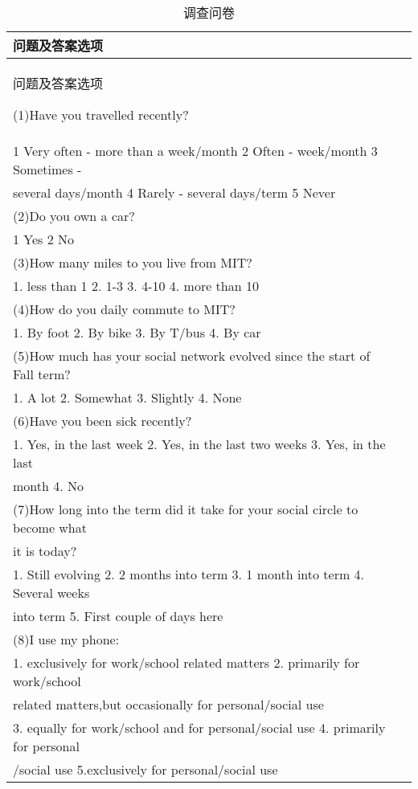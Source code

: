 \begin{longtable}[l]{l*{1}{l}}
\caption{调查问卷}\label{tab:questionnaire}\\
\toprule[1.5pt]
 问题及答案选项
\endfirsthead%

\multicolumn{1}{l}{续表-调查问卷}\\
\toprule[1.5pt]
 问题及答案选项
\endhead%
\hline%

\multicolumn{1}{l}{续下页}%

\endfoot%
\endlastfoot%
(1)Have you travelled recently? \\
1 Very often - more than a week/month 2 Often - week/month 3 Sometimes - \\
several days/month 4 Rarely - several days/term 5 Never \\
(2)Do you own a car? \\
1 Yes 2 No \\
(3)How many miles to you live from MIT? \\
1. less than 1 2. 1-3 3. 4-10 4. more than 10 \\
(4)How do you daily commute to MIT? \\
1. By foot 2. By bike 3. By T/bus 4. By car \\
(5)How much has your social network evolved since the start of Fall term? \\
1. A lot 2. Somewhat 3. Slightly 4. None \\
(6)Have you been sick recently? \\
1. Yes, in the last week 2. Yes, in the last two weeks 3. Yes, in the last \\
month 4. No \\
(7)How long into the term did it take for your social circle to become what \\
it is today? \\
1. Still evolving 2. 2 months into term 3. 1 month into term 4. Several weeks\\
into term 5. First couple of days here \\
(8)I use my phone: \\
1. exclusively for work/school related matters 2. primarily for work/school \\
related matters,but occasionally for personal/social use \\
3. equally for work/school and for personal/social use 4. primarily for personal\\
/social use 5.exclusively for personal/social use \\

\end{longtable}
